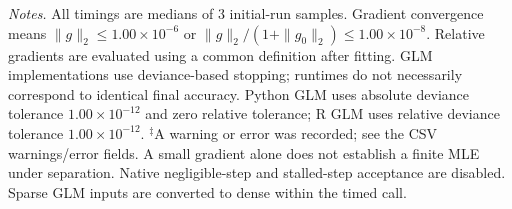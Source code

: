 \noindent\textit{Notes.} All timings are medians of 3 initial-run samples.
Gradient convergence means $\|g\|_2\leq 1.00\times10^{-6}$ or $\|g\|_2/(1+\|g_0\|_2)\leq 1.00\times10^{-8}$.
Relative gradients are evaluated using a common definition after fitting. GLM implementations use deviance-based stopping; runtimes do not necessarily correspond to identical final accuracy.
Python GLM uses absolute deviance tolerance $1.00\times10^{-12}$ and zero relative tolerance; R GLM uses relative deviance tolerance $1.00\times10^{-12}$.
$^{\ddagger}$A warning or error was recorded; see the CSV warnings/error fields. A small gradient alone does not establish a finite MLE under separation.
Native negligible-step and stalled-step acceptance are disabled.
Sparse GLM inputs are converted to dense within the timed call.
\par
\endgroup

